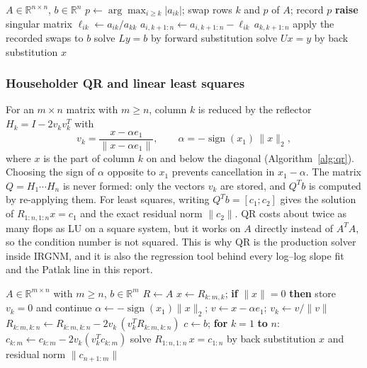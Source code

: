 \documentclass[sigconf,nonacm]{acmart}
\begin{document}
\begin{algorithm}[t]
\caption{LU with partial pivoting (\texttt{lu\_factor}, \texttt{lu\_solve})}
\label{alg:lu}
\small
\begin{algorithmic}[1]
\Require $A\in\mathbb{R}^{n\times n}$, $b\in\mathbb{R}^n$
  \State $p\gets\arg\max_{i\ge k}|a_{ik}|$; swap rows $k$ and $p$ of $A$; record $p$
   \State \textbf{raise} singular matrix \EndIf
    \State $\ell_{ik}\gets a_{ik}/a_{kk}$ 
    \State $a_{i,k+1:n}\gets a_{i,k+1:n}-\ell_{ik}\,a_{k,k+1:n}$
  \EndFor
\EndFor
\State apply the recorded swaps to $b$
\State solve $Ly=b$ by forward substitution
\State solve $Ux=y$ by back substitution
\State \Return $x$
\end{algorithmic}
\end{algorithm}

\subsubsection{Householder QR and linear least squares}
For an $m\times n$ matrix with $m\ge n$, column $k$ is reduced by the reflector $H_k=I-2v_kv_k^T$ with
\begin{equation}
v_k=\frac{x-\alpha e_1}{\|x-\alpha e_1\|},\qquad \alpha=-\operatorname{sign}(x_1)\,\|x\|_2,
\label{eq:householder}
\end{equation}
where $x$ is the part of column $k$ on and below the diagonal (Algorithm~\ref{alg:qr}). Choosing the sign of $\alpha$ opposite to $x_1$ prevents cancellation in $x_1-\alpha$. The matrix $Q=H_1\cdots H_n$ is never formed: only the vectors $v_k$ are stored, and $Q^Tb$ is computed by re-applying them. For least squares, writing $Q^Tb=[c_1;c_2]$ gives the solution of $R_{1:n,1:n}x=c_1$ and the exact residual norm $\|c_2\|$. QR costs about twice as many flops as LU on a square system, but it works on $A$ directly instead of $A^TA$, so the condition number is not squared. This is why QR is the production solver inside IRGNM, and it is also the regression tool behind every log--log slope fit and the Patlak line in this report.

\begin{algorithm}[t]
\caption{Householder least squares (\texttt{qr\_factor}, \texttt{qr\_lstsq})}
\label{alg:qr}
\small
\begin{algorithmic}[1]
\Require $A\in\mathbb{R}^{m\times n}$ with $m\ge n$, $b\in\mathbb{R}^m$
\State $R\gets A$
  \State $x\gets R_{k:m,k}$; \textbf{if} $\|x\|=0$ \textbf{then} store $v_k=0$ and continue
  \State $\alpha\gets-\operatorname{sign}(x_1)\|x\|_2$; $v\gets x-\alpha e_1$; $v_k\gets v/\|v\|$
  \State $R_{k:m,k:n}\gets R_{k:m,k:n}-2v_k\,(v_k^TR_{k:m,k:n})$
\EndFor
\State $c\gets b$; \textbf{for} $k=1$ \textbf{to} $n$: $c_{k:m}\gets c_{k:m}-2v_k(v_k^Tc_{k:m})$ 
\State solve $R_{1:n,1:n}\,x=c_{1:n}$ by back substitution
\State \Return $x$ and residual norm $\|c_{n+1:m}\|$
\end{algorithmic}
\end{algorithm}
\end{document}
